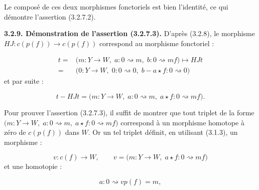 Le composé de ces deux morphismes fonctoriels est bien l'identité, ce qui
démontre l'assertion (3.2.7.2).

\noindent\textbf{3.2.9. Démonstration de l'assertion (3.2.7.3).}\quad
{}
D'après (3.2.8), le morphisme
$HJ\colon c(p(f))\longrightarrow c(p(f))$ correspond au morphisme
fonctoriel :

\begin{equation}
  \begin{aligned}
    t={}&\bigl(m\colon Y\longrightarrow W,\;
      a\colon0\rightsquigarrow m,\;
      b\colon0\rightsquigarrow mf\bigr)
      \longmapsto HJt\\
    ={}&\bigl(0\colon Y\longrightarrow W,\;
      0\colon0\rightsquigarrow0,\;
      b-a\star f\colon0\rightsquigarrow0\bigr)
  \end{aligned}
  \tag{3.2.9.1}
\end{equation}
et par suite :

\begin{equation}
  t-HJt=\bigl(m\colon Y\longrightarrow W,\;
    a\colon0\rightsquigarrow m,\;
    a\star f\colon0\rightsquigarrow mf\bigr).
  \tag{3.2.9.2}
\end{equation}

Pour prouver l'assertion (3.2.7.3), il suffit de montrer que tout triplet de
la forme
$\bigl(m\colon Y\longrightarrow W,\;a\colon0\rightsquigarrow m,\;
a\star f\colon0\rightsquigarrow mf\bigr)$ correspond à un morphisme
homotope à zéro de $c(p(f))$ dans $W$. Or un tel triplet définit, en
utilisant (3.1.3), un morphisme :

\begin{equation}
  v\colon c(f)\longrightarrow W,
  \qquad
  v=\bigl(m\colon Y\longrightarrow W,\;
    a\star f\colon0\rightsquigarrow mf\bigr)
  \tag{3.2.9.3}
\end{equation}
et une homotopie :

\begin{equation}
  a\colon0\rightsquigarrow vp(f)=m,
  \tag{3.2.9.4}
\end{equation}
